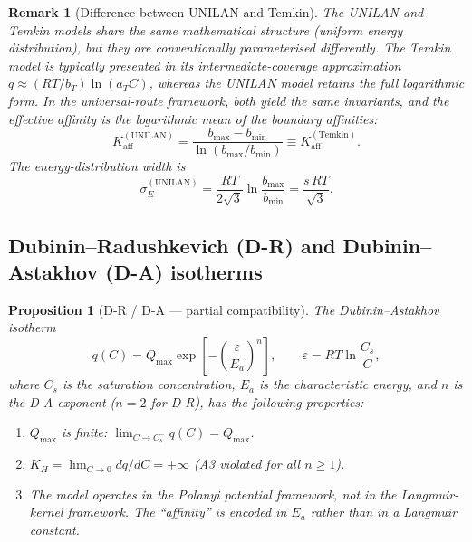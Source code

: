 \documentclass[12pt]{article}
\newtheorem{proposition}{Proposition}
\newtheorem{remark}{Remark}
\begin{document}
\begin{remark}[Difference between UNILAN and Temkin]
The UNILAN and Temkin models share the same mathematical structure
(uniform energy distribution), but they are conventionally parameterised
differently.  The Temkin model is typically presented in its
intermediate-coverage approximation $q \approx (RT/b_T)\ln(a_T C)$,
whereas the UNILAN model retains the full logarithmic form.  In the
universal-route framework, both yield the same invariants, and the
effective affinity is the logarithmic mean of the boundary affinities:
\begin{equation}
  K_{\mathrm{aff}}^{\mathrm{(UNILAN)}}
  = \frac{b_{\max} - b_{\min}}{\ln(b_{\max}/b_{\min})}
  \equiv K_{\mathrm{aff}}^{\mathrm{(Temkin)}}.
\end{equation}
The energy-distribution width is
\begin{equation}
  \sigma_E^{\mathrm{(UNILAN)}}
  = \frac{RT}{2\sqrt{3}}\ln\frac{b_{\max}}{b_{\min}}
  = \frac{s\,RT}{\sqrt{3}}.
  \label{eq:sigmaE_unilan_v5}
\end{equation}
\end{remark}

\subsection{Dubinin--Radushkevich (D-R) and Dubinin--Astakhov (D-A)
isotherms}

\begin{proposition}[D-R / D-A --- partial compatibility]
\label{prop:DA}
The Dubinin--Astakhov isotherm
\begin{equation}
  q(C) = Q_{\max}\exp\!\left[
    -\left(\frac{\varepsilon}{E_a}\right)^{\!n}\right],
  \qquad \varepsilon = RT\ln\frac{C_s}{C},
  \label{eq:DA}
\end{equation}
where $C_s$ is the saturation concentration, $E_a$ is the
characteristic energy, and $n$ is the D-A exponent ($n=2$ for D-R),
has the following properties:
\begin{enumerate}[nosep]
  \item $Q_{\max}$ is finite: $\lim_{C\to C_s^-} q(C) = Q_{\max}$.
  \item $K_H = \lim_{C\to 0} dq/dC = +\infty$
        \quad (A3 violated for all $n \ge 1$).
  \item The model operates in the Polanyi potential framework, not in
        the Langmuir-kernel framework.  The ``affinity'' is encoded in
        $E_a$ rather than in a Langmuir constant.
\end{enumerate}
\end{proposition}
\end{document}
